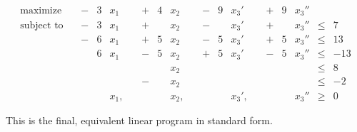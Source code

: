 \documentclass[a4paper,12pt,headsepline]{scrartcl}
\begin{document}
\begin{equation*}
  \begin{aligned}
    \text{maximize}   & \, & - & 3 & x_1  & \, & +   & 4   & x_2  & \, & - & 9   & x_3'  & \, & + & 9 & x_3'' &     &     \\
    \text{subject to} & \, & - & 3 & x_1  & \, & +   &     & x_2  & \, & - &     & x_3'  & \, & + &   & x_3'' & \le & 7   \\
                      & \, & - & 6 & x_1  & \, & +   & 5   & x_2  & \, & - & 5   & x_3'  & \, & + & 5 & x_3'' & \le & 13  \\
                      & \, &   & 6 & x_1  & \, & -   & 5   & x_2  & \, & + & 5   & x_3'  & \, & - & 5 & x_3'' & \le & -13 \\
                      & \, &   &   &      & \, &     &     & x_2  & \, &   &     &       & \, &   &   &       & \le & 8   \\
                      & \, &   &   &      & \, & -   &     & x_2  & \, &   &     &       & \, &   &   &       & \le & -2  \\
                      & \, &   &   & x_1, & \, &     &     & x_2, & \, &   &     & x_3', & \, &   &   & x_3'' & \ge & 0
  \end{aligned}
\end{equation*}

This is the final, equivalent linear program in standard form.
 
\end{document}
